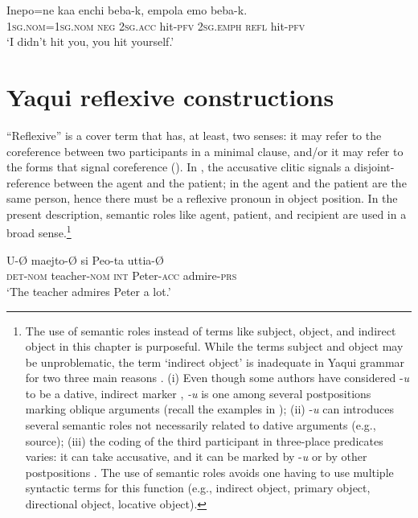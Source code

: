 \documentclass[output=paper]{langscibook}
\begin{document}
\ex
\label{ex:guerrero:13c}
\gll Inepo=ne  kaa  enchi  beba-k, empola emo   beba-k.\\
  \textsc{1sg.nom=1sg.nom}   \textsc{neg}   \textsc{2sg.acc}   hit-\textsc{pfv}   \textsc{2sg.emph}  \textsc{refl}  hit-\textsc{pfv}\\
\glt ‘I didn’t hit you, you hit yourself.’
\z
\z

\section{Yaqui reflexive constructions}\label{sec:guerrero:3}


“Reflexive” is a cover term that has, at least, two senses: it may refer to the coreference between two participants in a minimal clause, and/or it may refer to the forms that signal coreference (\citealt{Kemmer1993, FrajzyngierCurl1999, KoenigGast2008, Creissels2016}). In , the accusative clitic signals a disjoint-reference between the agent and the patient; in  the agent and the patient are the same person, hence there must be a reflexive pronoun in object position. In the present description, semantic roles like agent, patient, and recipient are used in a broad sense.\footnote{The use of semantic roles instead of terms like subject, object, and indirect object in this chapter is purposeful. While the terms subject and object may be unproblematic, the term ‘indirect object’ is inadequate in Yaqui grammar for two three main reasons \citep{Guerrero2019a}. (i) Even though some authors have considered -\textit{u} to be a dative, indirect marker \citep{Estrada2009}, \textit{-u} is one among several postpositions marking oblique arguments (recall the examples in ); (ii) -\textit{u} can introduces several semantic roles not necessarily related to dative arguments (e.g., source); (iii) the coding of the third participant in three-place predicates varies: it can take accusative, and it can be marked by -\textit{u} or by other postpositions \citep{GuerreroVanValin2004}. The use of semantic roles avoids one having to use multiple syntactic terms for this function (e.g., indirect object, primary object, directional object, locative object).}



\ea%
  \label{ex:guerrero:14}

\ea
\label{ex:guerrero:14a}
\gll U-Ø maejto-Ø si Peo-ta uttia-Ø\\
  \textsc{det-nom} teacher-\textsc{nom}  \textsc{int} Peter-\textsc{acc}  admire-\textsc{prs}\\
\glt ‘The teacher admires Peter a lot.’
\end{document}
